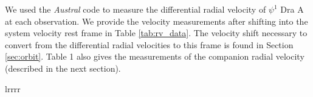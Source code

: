 \documentclass[twocolumn]{emulateapj}
\begin{document}
We used the \emph{Austral} code \citep{Endl2000} to measure the differential radial velocity of $\psi^1$ Dra A at each observation. We provide the velocity measurements after shifting into the system velocity rest frame in Table \ref{tab:rv_data}. The velocity shift necessary to convert from the differential radial velocities to this frame is found in Section \ref{sec:orbit}. Table 1 also gives the measurements of the companion radial velocity (described in the next section).



\begin{deluxetable}{lrrrr}
\tabletypesize{\footnotesize}
\tablewidth{0pt}

\startdata


\end{deluxetable}
\end{document}
